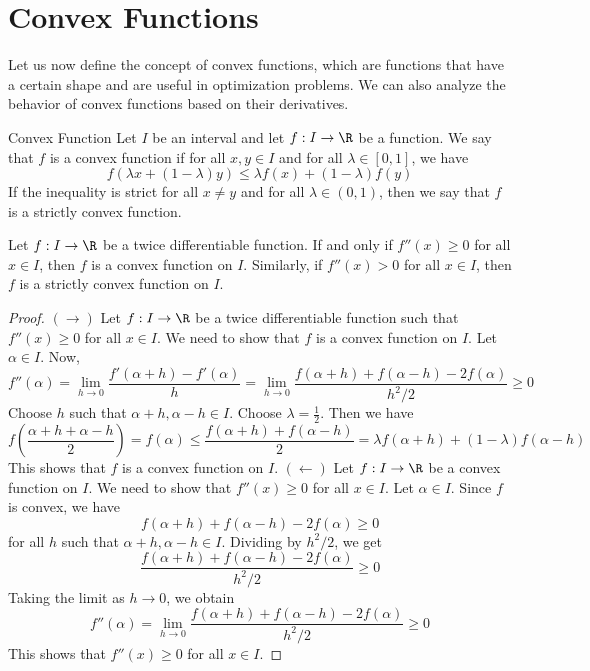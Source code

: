 \documentclass[openany]{book}
\begin{document}
\section{Convex Functions}
Let us now define the concept of convex functions, which are functions that have a certain shape and are useful in optimization problems. We can also analyze the behavior of convex functions based on their derivatives.
\begin{mydefinition}{Convex Function}
    Let $I$ be an interval and let $f: I \to \R$ be a function. We say that $f$ is a convex function if for all $x, y \in I$ and for all $\lambda \in [0, 1]$, we have
    \[
        f(\lambda x + (1 - \lambda) y) \leq \lambda f(x) + (1 - \lambda) f(y)
    \]
    If the inequality is strict for all $x \neq y$ and for all $\lambda \in (0, 1)$, then we say that $f$ is a strictly convex function.
\end{mydefinition}
\begin{mytheorem}
    Let $f: I \to \R$ be a twice differentiable function. If and only if $f''(x) \geq 0$ for all $x \in I$, then $f$ is a convex function on $I$. Similarly, if $f''(x) > 0$ for all $x \in I$, then $f$ is a strictly convex function on $I$.
\end{mytheorem}
\begin{proof}
    $(\rightarrow)$ Let $f: I \to \R$ be a twice differentiable function such that $f''(x) \geq 0$ for all $x \in I$. We need to show that $f$ is a convex function on $I$. Let $\alpha \in I$. Now, 
    \[f''(\alpha) = \lim_{h \to 0} \frac{f'(\alpha + h) - f'(\alpha)}{h} = \lim_{h \to 0} \frac{f(\alpha + h) + f(\alpha -h) - 2f(\alpha)}{h^2/2} \geq 0
    \]
    Choose $h$ such that $\alpha + h, \alpha - h \in I$. Choose $\lambda = \frac{1}{2}$. Then we have
    \[
        f\left(\frac{\alpha + h + \alpha - h}{2}\right) = f(\alpha) \leq \frac{f(\alpha + h) + f(\alpha - h)}{2} = \lambda f(\alpha + h) + (1 - \lambda) f(\alpha - h)
    \]
    This shows that $f$ is a convex function on $I$.
    $(\leftarrow)$ Let $f: I \to \R$ be a convex function on $I$. We need to show that $f''(x) \geq 0$ for all $x \in I$. Let $\alpha \in I$. Since $f$ is convex, we have
    \[
        f(\alpha + h) + f(\alpha - h) - 2f(\alpha) \geq 0
    \]
    for all $h$ such that $\alpha + h, \alpha - h \in I$. Dividing by $h^2/2$, we get
    \[
        \frac{f(\alpha + h) + f(\alpha - h) - 2f(\alpha)}{h^2/2} \geq 0
    \]
    Taking the limit as $h \to 0$, we obtain
    \[
        f''(\alpha) = \lim_{h \to 0} \frac{f(\alpha + h) + f(\alpha - h) - 2f(\alpha)}{h^2/2} \geq 0
    \]
    This shows that $f''(x) \geq 0$ for all $x \in I$.
\end{proof}
\end{document}
